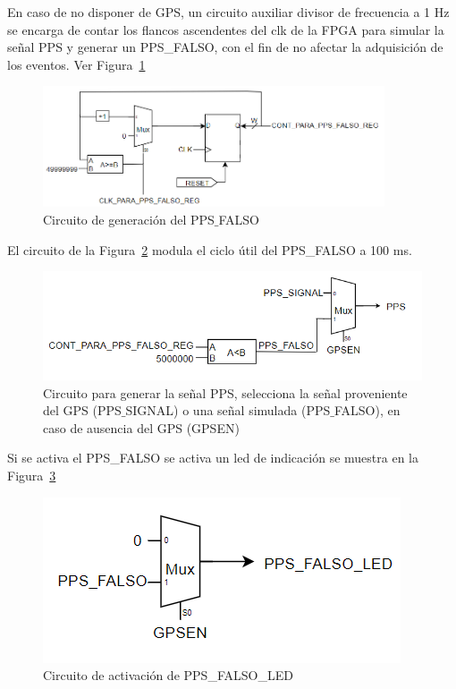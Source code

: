 En caso de no disponer de GPS, un circuito auxiliar divisor de frecuencia a 1 Hz se encarga de contar los flancos ascendentes del clk de la FPGA para simular la señal PPS y generar un PPS\_FALSO, con el fin de no afectar la adquisición de los eventos. Ver Figura~\ref{ppsfalso} 

\begin{figure}[H]
\includegraphics[width=0.9\textwidth]{Figs/CONPPSFALSO.PNG} 
\centering
\caption{Circuito de generación del PPS$\_$FALSO}
\label{ppsfalso}
\end{figure}

El circuito de la Figura~\ref{comparafalso} modula el ciclo útil del PPS\_FALSO a 100 ms.

\begin{figure}[H]
\includegraphics[scale=0.8]{Figs/PPSP.PNG} 
\centering
\caption[Circuito para generar la señal PPS]{Circuito para generar la señal PPS, selecciona la señal proveniente del GPS (PPS$\_$SIGNAL) o una señal simulada (PPS$\_$FALSO), en caso de ausencia del GPS (GPSEN)}
\label{comparafalso}
\end{figure}

Si se activa el PPS\_FALSO se activa un led de indicación se muestra en la Figura~\ref{ledfalso}
\begin{figure}[H]
\includegraphics[scale=0.8]{Figs/TRIGER5.PNG} 
\centering
\caption{Circuito de activación de PPS\_FALSO\_LED}
\label{ledfalso}
\end{figure}

